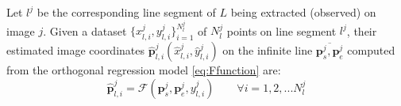 

Let $l^j$ be the corresponding line segment of $L$ being extracted (observed) on image $j$. Given a dataset $\{x^j_{l,i},y^j_{l,i}\}^{N^j_l}_{i=1}$ of $N^j_l$ points on line segment $l^j$, their estimated image coordinates $\hat{\mathbf{p}}^j_{l,i}(\hat{x}^j_{l,i},\hat{y}^j_{l,i})$ on the infinite line $\overline{\mathbf{p}^j_s,\mathbf{p}^j_e}$ computed from the orthogonal regression model \eqref{eq:Ffunction} are:
\begin{equation} \label{eq:obsmodel-linefitting}
\hat{\mathbf{p}}^j_{l,i} = \mathcal{F}(\mathbf{p}^j_s,\mathbf{p}^j_e,y^j_{l,i})
\qquad
\forall i=1,2,...N^j_l
\end{equation}

